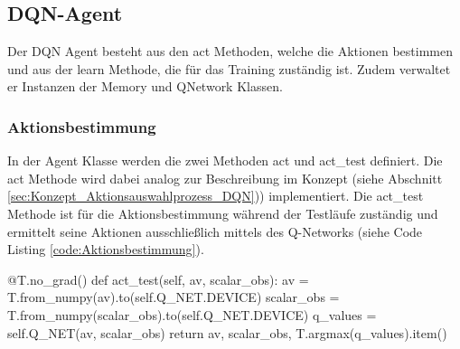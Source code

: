 \subsection{DQN-Agent} \label{sec:Implementierung_DQN_Agent}
Der DQN Agent besteht aus den act Methoden, welche die Aktionen bestimmen und aus der learn Methode, die für das Training zuständig ist. Zudem verwaltet er Instanzen der Memory und QNetwork Klassen.

\subsubsection{Aktionsbestimmung} \label{sec:Implementierung_act_DQN}
In der Agent Klasse werden die zwei Methoden act und act\_test definiert. Die act Methode wird dabei analog zur Beschreibung im Konzept (siehe Abschnitt \ref{sec:Konzept_Aktionsauswahlprozess_DQN})) implementiert.
Die act\_test Methode ist für die Aktionsbestimmung während der Testläufe zuständig und ermittelt seine Aktionen ausschließlich mittels des Q-Networks (siehe Code Listing \ref{code:Aktionsbestimmung}).
\begin{python}
@T.no_grad()
def act_test(self, av, scalar_obs):
	av = T.from_numpy(av).to(self.Q_NET.DEVICE)
	scalar_obs = T.from_numpy(scalar_obs).to(self.Q_NET.DEVICE)
	q_values = self.Q_NET(av, scalar_obs)
	return av, scalar_obs, T.argmax(q_values).item()
\end{python}
\begin{lstlisting}[caption=Aktionsbestimmung, label=code:Aktionsbestimmung]
\end{lstlisting}

